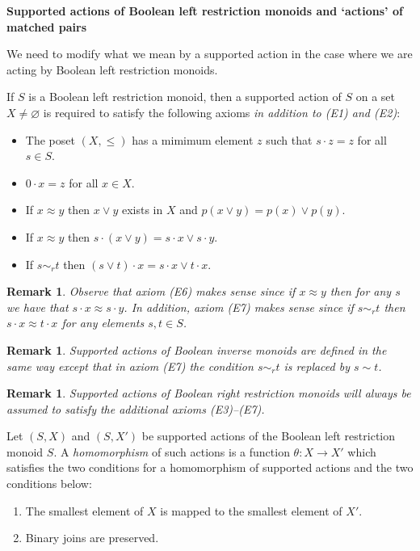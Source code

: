 \documentclass[a4paper]{amsart}
\newtheorem{remark}[theorem]{Remark}
\begin{document}
\begin{center}
{\bf Supported actions of  Boolean left restriction monoids and `actions' of matched pairs}
\end{center}


We need to modify what we mean by a supported action in the case where we are acting by Boolean left restriction monoids.

If $S$ is a Boolean left restriction monoid, then a supported action of $S$ on a set $X \neq \varnothing$ is required to satisfy the following axioms {\em in addition to (E1) and (E2)}:
\begin{itemize}
\item[{\rm (E3).}] The poset $(X,\leq)$ has a mimimum element $z$ such that $s \cdot z = z$ for all $s \in S$.
\item[{\rm (E4).}] $0 \cdot x = z$ for all $x \in X$. 
\item[{\rm (E5).}] If $x \approx y$ then $x \vee y$ exists in $X$ and $p(x \vee y) = p(x) \vee p(y)$.
\item[{\rm (E6).}] If $x \approx y$ then $s \cdot (x \vee y) = s \cdot x \vee s \cdot y$.
\item[{\rm (E7).}] If $s \sim_{r} t$ then $(s \vee t) \cdot x = s \cdot x \vee t \cdot x$.
\end{itemize}

\begin{remark}{\em Observe that axiom (E6) makes sense since if $x \approx y$ then for any $s$ we have that
$s \cdot x \approx s \cdot y$. In addition, axiom (E7) makes sense since if $s \sim_{r} t$ then $s \cdot x \approx t \cdot x$
for any elements $s,t \in S$.}
\end{remark}

\begin{remark}{\em 
Supported actions of Boolean inverse monoids are defined in the same way except that in axiom (E7)
the condition $s \sim_{r} t$ is replaced by $s \sim t$.}
\end{remark}

\begin{remark}{\em Supported actions of Boolean right restriction monoids
will always be assumed to satisfy the additional axioms (E3)--(E7).}
\end{remark}

Let $(S,X)$ and $(S,X')$ be supported actions of the Boolean left restriction monoid $S$.
A {\em homomorphism} of such actions is a function $\theta \colon X \rightarrow X'$ 
which satisfies the two conditions for a homomorphism of supported actions and the two conditions below:
\begin{enumerate}
\item The smallest element of $X$ is mapped to the smallest element of $X'$.
\item Binary joins are preserved. 
\end{enumerate}
\end{document}
